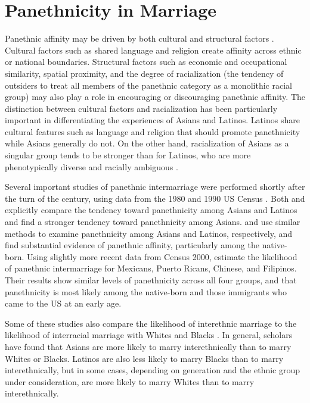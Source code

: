 \documentclass[11pt,]{article}
\begin{document}
\hypertarget{panethnicity-in-marriage}{%
\section{Panethnicity in Marriage}\label{panethnicity-in-marriage}}

Panethnic affinity may be driven by both cultural and structural factors \citep{lopez_panethnicity_1990}. Cultural factors such as shared language and religion create affinity across ethnic or national boundaries. Structural factors such as economic and occupational similarity, spatial proximity, and the degree of racialization (the tendency of outsiders to treat all members of the panethnic category as a monolithic racial group) may also play a role in encouraging or discouraging panethnic affinity. The distinction between cultural factors and racialization has been particularly important in differentiating the experiences of Asians and Latinos. Latinos share cultural features such as language and religion that should promote panethnicity while Asians generally do not. On the other hand, racialization of Asians as a singular group tends to be stronger than for Latinos, who are more phenotypically diverse and racially ambiguous \citep{lopez_panethnicity_1990, kibria_construction_1997, qian_latinos_2004}.

Several important studies of panethnic intermarriage were performed shortly after the turn of the century, using data from the 1980 and 1990 US Census \citep{qian_asian_2001, rosenfeld_salience_2001, qian_latinos_2004, fu_how_2007a}. Both \citet{rosenfeld_salience_2001} and \citet{fu_how_2007a} explicitly compare the tendency toward panethnicity among Asians and Latinos and find a stronger tendency toward panethnicity among Asians. \citet{qian_asian_2001} and \citet{qian_latinos_2004} use similar methods to examine panethnicity among Asians and Latinos, respectively, and find substantial evidence of panethnic affinity, particularly among the native-born. Using slightly more recent data from Census 2000, \citet{qian_crossing_2012} estimate the likelihood of panethnic intermarriage for Mexicans, Puerto Ricans, Chinese, and Filipinos. Their results show similar levels of panethnicity across all four groups, and that panethnicity is most likely among the native-born and those immigrants who came to the US at an early age.

Some of these studies also compare the likelihood of interethnic marriage to the likelihood of interracial marriage with Whites and Blacks \citep{qian_asian_2001, fu_how_2007a, qian_crossing_2012}. In general, scholars have found that Asians are more likely to marry interethnically than to marry Whites or Blacks. Latinos are also less likely to marry Blacks than to marry interethnically, but in some cases, depending on generation and the ethnic group under consideration, are more likely to marry Whites than to marry interethnically.
\end{document}
